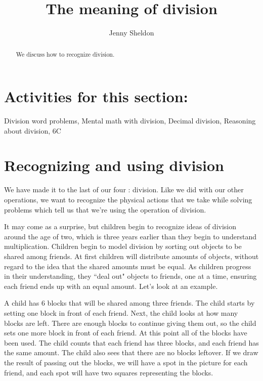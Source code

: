 \documentclass{ximera}
\title{The meaning of division}
\author{Jenny Sheldon}
\begin{document}
\begin{abstract}
We discuss how to recognize division.
\end{abstract}
\maketitle

\section{Activities for this section:} Division word problems, Mental math with division, Decimal division, Reasoning about division, 6C


\section{Recognizing and using division}
We have made it to the last of our four : division. Like we did with our other operations, we want to recognize the physical actions that we take while solving problems which tell us that we're using the operation of division. 

It may come as a surprise, but children begin to recognize ideas of division around the age of two, which is three years earlier than they begin to understand multiplication. Children begin to model division by sorting out objects to be shared among friends. At first children will distribute amounts of objects, without regard to the idea that the shared amounts must be equal. As children progress in their understanding, they ``deal out" objects to friends, one at a time, ensuring each friend ends up with an equal amount. Let's look at an example.

A child has 6 blocks that will be shared among three friends. The child starts by setting one block in front of each friend. Next, the child looks at how many blocks are left. There are enough blocks to continue giving them out, so the child sets one more block in front of each friend. At this point all of the blocks have been used. The child counts that each friend has three blocks, and each friend has the same amount. The child also sees that there are no blocks leftover. If we draw the result of passing out the blocks, we will have a spot in the picture for each friend, and each spot will have two squares representing the blocks.
\begin{image}
\end{image}
\end{document}
